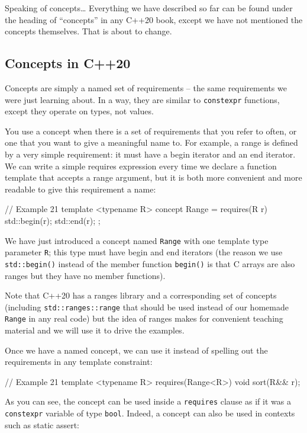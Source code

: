 Speaking of concepts\ldots{} Everything we have described so far can be found under the heading of ``concepts'' in any C++20 book, except we have not mentioned the concepts themselves. That is about to change.

\subsection{Concepts in C++20}

Concepts are simply a named set of requirements -- the same requirements we were just learning about. In a way, they are similar to \texttt{constexpr} functions, except they operate on types, not values.

You use a concept when there is a set of requirements that you refer to often, or one that you want to give a meaningful name to. For example, a range is defined by a very simple requirement: it must have a begin iterator and an end iterator. We can write a simple requires expression every time we declare a function template that accepts a range argument, but it is both more convenient and more readable to give this requirement a name:

\begin{code}
// Example 21
template <typename R> concept Range = requires(R r) {
  std::begin(r);
  std::end(r);
};
\end{code}

We have just introduced a concept named \texttt{Range} with one template type parameter \texttt{R}; this type must have begin and end iterators (the reason we use \texttt{std::begin()} instead of the member function \texttt{begin()} is that C arrays are also ranges but they have no member functions).

Note that C++20 has a ranges library and a corresponding set of concepts (including \texttt{std::ranges::range} that should be used instead of our homemade \texttt{Range} in any real code) but the idea of ranges makes for convenient teaching material and we will use it to drive the examples.

Once we have a named concept, we can use it instead of spelling out the requirements in any template constraint:

\begin{code}
// Example 21
template <typename R> requires(Range<R>) void sort(R&& r);
\end{code}

As you can see, the concept can be used inside a \texttt{requires} clause as if it was a \texttt{constexpr} variable of type \texttt{bool}. Indeed, a concept can also be used in contexts such as static assert:

